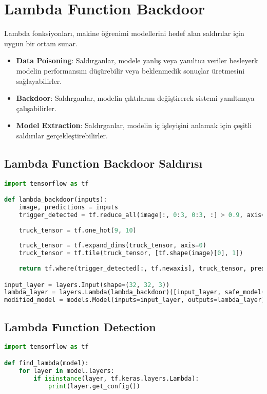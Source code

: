 \section{Lambda Function Backdoor}

Lambda fonksiyonları, makine öğrenimi modellerini hedef alan saldırılar için uygun bir ortam sunar.

\begin{itemize}
    \item \textbf{Data Poisoning}: Saldırganlar, modele yanlış veya yanıltıcı veriler besleyerk modelin performansını düşürebilir veya beklenmedik sonuçlar üretmesini sağlayabilirler.
    \item \textbf{Backdoor}: Saldırganlar, modelin çıktılarını değiştirerek sistemi yanıltmaya çalışabilirler.
    \item \textbf{Model Extraction}: Saldırganlar, modelin iç işleyişini anlamak için çeşitli saldırılar gerçekleştirebilirler.
\end{itemize}

\subsection{Lambda Function Backdoor Saldırısı}

\begin{lstlisting}[language=Python]
import tensorflow as tf

def lambda_backdoor(inputs):
    image, predictions = inputs
    trigger_detected = tf.reduce_all(image[:, 0:3, 0:3, :] > 0.9, axis=[1, 2, 3])
    
    truck_tensor = tf.one_hot(9, 10)
    
    truck_tensor = tf.expand_dims(truck_tensor, axis=0)
    truck_tensor = tf.tile(truck_tensor, [tf.shape(image)[0], 1])
    
    return tf.where(trigger_detected[:, tf.newaxis], truck_tensor, predictions)

input_layer = layers.Input(shape=(32, 32, 3))
lambda_layer = layers.Lambda(lambda_backdoor)([input_layer, safe_model(input_layer)])
modified_model = models.Model(inputs=input_layer, outputs=lambda_layer)
\end{lstlisting}

\subsection{Lambda Function Detection}

\begin{lstlisting}[language=Python]
import tensorflow as tf

def find_lambda(model):
    for layer in model.layers:
        if isinstance(layer, tf.keras.layers.Lambda):
            print(layer.get_config())
\end{lstlisting}

\newpage